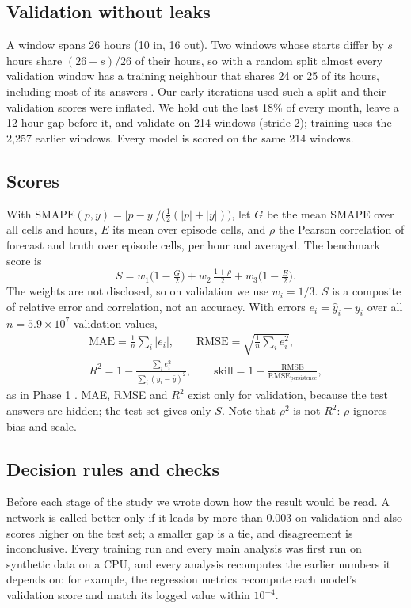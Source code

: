 \documentclass[conference]{IEEEtran}
\begin{document}
\subsection{Validation without leaks}
A window spans 26 hours (10 in, 16 out). Two windows whose starts differ by $s$ hours share $(26-s)/26$ of their hours, so with a random split almost every validation window has a training neighbour that shares 24 or 25 of its hours, including most of its answers \cite{roberts2017}. Our early iterations used such a split and their validation scores were inflated. We hold out the last 18\% of every month, leave a 12-hour gap before it, and validate on 214 windows (stride 2); training uses the 2{,}257 earlier windows. Every model is scored on the same 214 windows.

\subsection{Scores}
With $\mathrm{SMAPE}(p,y)=|p-y|/\bigl(\tfrac12(|p|+|y|)\bigr)$, let $G$ be the mean SMAPE over all cells and hours, $E$ its mean over episode cells, and $\rho$ the Pearson correlation of forecast and truth over episode cells, per hour and averaged. The benchmark score is
\begin{equation}
S = w_1\bigl(1-\tfrac{G}{2}\bigr) + w_2\,\tfrac{1+\rho}{2} + w_3\bigl(1-\tfrac{E}{2}\bigr).
\end{equation}
The weights are not disclosed, so on validation we use $w_i=1/3$. $S$ is a composite of relative error and correlation, not an accuracy. With errors $e_i=\hat{y}_i-y_i$ over all $n = 5.9\times10^7$ validation values,
\begin{gather}
\mathrm{MAE}=\tfrac1n\textstyle\sum_i|e_i|, \qquad \mathrm{RMSE}=\sqrt{\tfrac1n\textstyle\sum_i e_i^2}, \\
R^2 = 1-\frac{\sum_i e_i^2}{\sum_i (y_i-\bar{y})^2}, \qquad \text{skill} = 1-\frac{\mathrm{RMSE}}{\mathrm{RMSE}_{\text{persistence}}},
\end{gather}
as in Phase 1 \cite{phase1}. MAE, RMSE and $R^2$ exist only for validation, because the test answers are hidden; the test set gives only $S$. Note that $\rho^2$ is not $R^2$: $\rho$ ignores bias and scale.

\subsection{Decision rules and checks}
Before each stage of the study we wrote down how the result would be read. A network is called better only if it leads by more than 0.003 on validation and also scores higher on the test set; a smaller gap is a tie, and disagreement is inconclusive. Every training run and every main analysis was first run on synthetic data on a CPU, and every analysis recomputes the earlier numbers it depends on: for example, the regression metrics recompute each model's validation score and match its logged value within $10^{-4}$.
\end{document}
